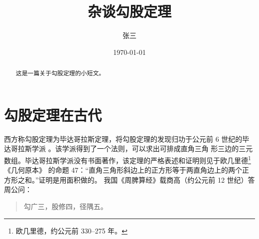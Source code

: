 \documentclass[UTF8] {ctexart}
\title{\heiti 杂谈勾股定理}
\author{\kaishu 张三}
\date{\today}
\newenvironment{myquote}            %
{\begin{quote}\kaishu\zihao{-5}}    %
{\end{quote}}                       %
\begin{document}
\maketitle  %
\begin{abstract}
这是一篇关于勾股定理的小短文。 %
\end{abstract}

\tableofcontents    %

\section{勾股定理在古代}   %
\label{sec:ancient}     %
西方称勾股定理为毕达哥拉斯定理，将勾股定理的发现归功于公元前 6 世纪的毕达哥拉斯学派 \cite{Kline}。该学派得到了一个法则，可以求出可排成直角三角
形三边的三元数组。毕达哥拉斯学派没有书面著作，该定理的严格表述和证明则见于欧几里德\footnote{欧几里德，约公元前 330--275 年。}《几何原本》
的命题 47：“直角三角形斜边上的正方形等于两直角边上的两个正方形之和。”证明是用面积做的。   %
我国《周脾算经》载商高（约公元前 12 世纪）答周公问：
\begin{myquote}   %
勾广三，股修四，径隅五。
\end{myquote}
\end{document}

